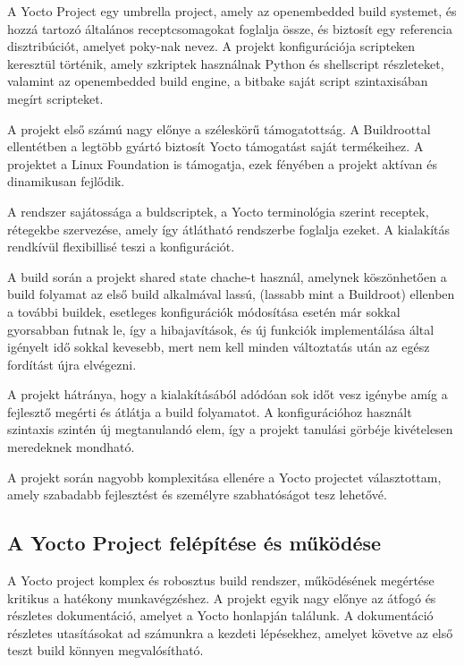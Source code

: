 A Yocto Project egy umbrella project, amely az openembedded build systemet, és
hozzá tartozó általános receptcsomagokat foglalja össze, és biztosít egy
referencia disztribúciót, amelyet poky-nak nevez. A projekt konfigurációja
scripteken keresztül történik, amely szkriptek használnak Python és shellscript
részleteket, valamint az openembedded build engine, a bitbake saját script
szintaxisában megírt scripteket.

A projekt első számú nagy előnye a széleskörű támogatottság. A Buildroottal
ellentétben a legtöbb gyártó biztosít Yocto támogatást saját termékeihez. A
projektet a Linux Foundation is támogatja, ezek fényében a projekt aktívan és
dinamikusan fejlődik. 

A rendszer sajátossága a buldscriptek, a Yocto terminológia szerint receptek,
rétegekbe szervezése, amely így átlátható rendszerbe foglalja ezeket. A
kialakítás rendkívül flexibillisé teszi a konfigurációt.

A build során a projekt shared state chache-t használ, amelynek köszönhetően a
build folyamat az első build alkalmával lassú, (lassabb mint a Buildroot)
ellenben a további buildek, esetleges konfigurációk módosítása esetén már sokkal
gyorsabban futnak le, így a hibajavítások, és új funkciók implementálása által
igényelt idő sokkal kevesebb, mert nem kell minden változtatás után az egész
fordítást újra elvégezni.  

A projekt hátránya, hogy a kialakításából adódóan sok időt vesz igénybe amíg a
fejlesztő megérti és átlátja a build folyamatot. A konfigurációhoz használt
szintaxis szintén új megtanulandó elem, így a projekt tanulási görbéje
kivételesen meredeknek mondható.

\medskip

A projekt során nagyobb komplexitása ellenére a Yocto projectet választottam,
amely szabadabb fejlesztést és személyre szabhatóságot tesz lehetővé.

\subsection{A Yocto Project felépítése és működése}

A Yocto project komplex és robosztus build rendszer, működésének megértése
kritikus a hatékony munkavégzéshez. A projekt egyik nagy előnye az átfogó és
részletes dokumentáció, amelyet a Yocto honlapján
találunk. A dokumentáció részletes utasításokat ad számunkra a kezdeti
lépésekhez, amelyet követve az első teszt build könnyen megvalósítható.

